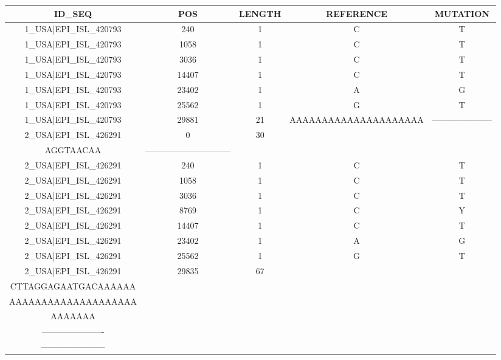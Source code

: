\documentclass[a4paper,10pt]{article}
\begin{document}
\begin{longtable}{@{}ccccc@{}}
\toprule
\textbf{ID\_SEQ} & \textbf{POS} & \textbf{LENGTH} & \textbf{REFERENCE} & \textbf{MUTATION} \\* \midrule
\endfirsthead
%
\cline{1-5}
\endhead
%
1\_USA|EPI\_ISL\_420793 & 240 & 1 & C & T \\* \midrule
1\_USA|EPI\_ISL\_420793 & 1058 & 1 & C & T \\* \midrule
1\_USA|EPI\_ISL\_420793 & 3036 & 1 & C & T \\* \midrule
1\_USA|EPI\_ISL\_420793 & 14407 & 1 & C & T \\* \midrule
1\_USA|EPI\_ISL\_420793 & 23402 & 1 & A & G \\* \midrule
1\_USA|EPI\_ISL\_420793 & 25562 & 1 & G & T \\* \midrule
1\_USA|EPI\_ISL\_420793 & 29881 & 21 & AAAAAAAAAAAAAAAAAAAAA & --------------------- \\* \midrule
2\_USA|EPI\_ISL\_426291 & 0 & 30 & \begin{tabular}[c]{@{}c@{}}ATTAAAGGTTTATACCTTCCC\\ AGGTAACAA\end{tabular} & ------------------------------ \\* \midrule
2\_USA|EPI\_ISL\_426291 & 240 & 1 & C & T \\* \midrule
2\_USA|EPI\_ISL\_426291 & 1058 & 1 & C & T \\* \midrule
2\_USA|EPI\_ISL\_426291 & 3036 & 1 & C & T \\* \midrule
2\_USA|EPI\_ISL\_426291 & 8769 & 1 & C & Y \\* \midrule
2\_USA|EPI\_ISL\_426291 & 14407 & 1 & C & T \\* \midrule
2\_USA|EPI\_ISL\_426291 & 23402 & 1 & A & G \\* \midrule
2\_USA|EPI\_ISL\_426291 & 25562 & 1 & G & T \\* \midrule
2\_USA|EPI\_ISL\_426291 & 29835 & 67 & \begin{tabular}[c]{@{}c@{}}CCATGTGATTTTAATAGCTT\\ CTTAGGAGAATGACAAAAAA \\AAAAAAAAAAAAAAAAAAAA \\ AAAAAAA\end{tabular} & \begin{tabular}[c]{@{}c@{}}----------------------\\ ----------------------\\ -----------------------\end{tabular} \\* \midrule

\end{longtable}
\end{document}
